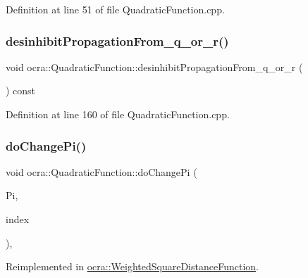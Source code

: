 Definition at line 51 of file Quadratic\+Function.\+cpp.

\hypertarget{classocra_1_1QuadraticFunction_a49b61db0ab95c82d8f42d66f4a4f60a9}{}\label{classocra_1_1QuadraticFunction_a49b61db0ab95c82d8f42d66f4a4f60a9} 
\subsubsection{\texorpdfstring{desinhibit\+Propagation\+From\+\_\+q\+\_\+or\+\_\+r()}{desinhibitPropagationFrom\_q\_or\_r()}}
{\footnotesize\ttfamily void ocra\+::\+Quadratic\+Function\+::desinhibit\+Propagation\+From\+\_\+q\+\_\+or\+\_\+r (\begin{DoxyParamCaption}{ }\end{DoxyParamCaption}) const\hspace{0.3cm}{\ttfamily [protected]}}



Definition at line 160 of file Quadratic\+Function.\+cpp.

\hypertarget{classocra_1_1QuadraticFunction_a30d2c2217918164d24aaeadde5698d03}{}\label{classocra_1_1QuadraticFunction_a30d2c2217918164d24aaeadde5698d03} 
\subsubsection{\texorpdfstring{do\+Change\+Pi()}{doChangePi()}}
{\footnotesize\ttfamily void ocra\+::\+Quadratic\+Function\+::do\+Change\+Pi (\begin{DoxyParamCaption}\item[{const Matrix\+Xd \&}]{Pi,  }\item[{int}]{index }\end{DoxyParamCaption})\hspace{0.3cm}{\ttfamily [protected]}, {\ttfamily [virtual]}}



Reimplemented in \hyperlink{classocra_1_1WeightedSquareDistanceFunction_a2364e1c3908842eb252128256015d57b}{ocra\+::\+Weighted\+Square\+Distance\+Function}.



